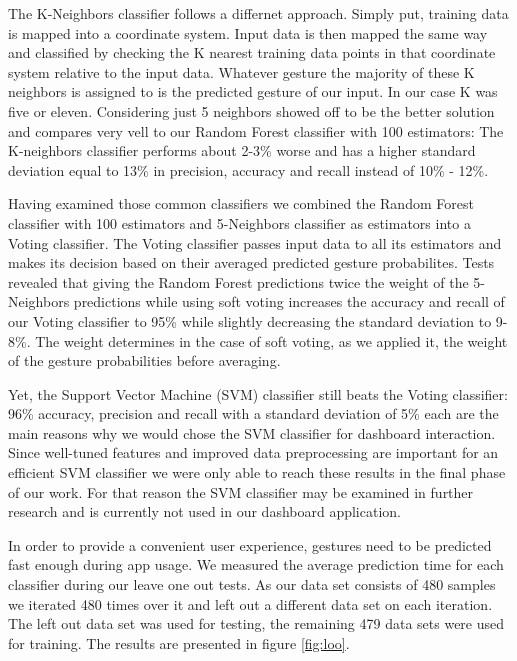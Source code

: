 The K-Neighbors classifier follows a differnet approach. Simply put, training data is mapped into a coordinate system. Input data is then mapped the same way and classified by checking the K nearest training data points in that coordinate system relative to the input data. Whatever gesture the majority of these K neighbors is assigned to is the predicted gesture of our input. In our case K was five or eleven. Considering just 5 neighbors showed off to be the better solution and compares very vell to our Random Forest classifier with 100 estimators: The K-neighbors classifier performs about 2-3\% worse and has a higher standard deviation equal to 13\% in precision, accuracy and recall instead of 10\% - 12\%.

Having examined those common classifiers we combined the Random Forest classifier with 100 estimators and 5-Neighbors classifier as estimators into a Voting classifier. The Voting classifier passes input data to all its estimators and makes its decision based on their averaged predicted gesture probabilites. Tests revealed that giving the Random Forest predictions twice the weight of the 5-Neighbors predictions while using soft voting increases the accuracy and recall of our Voting classifier to 95\% while slightly decreasing the standard deviation to 9-8\%. The weight determines in the case of soft voting, as we applied it, the weight of the gesture probabilities before averaging.

Yet, the Support Vector Machine (SVM) classifier still beats the Voting classifier: 96\% accuracy, precision and recall with a standard deviation of 5\% each are the main reasons why we would chose the SVM classifier for dashboard interaction. Since well-tuned features and improved data preprocessing are important for an efficient SVM classifier we were only able to reach these results in the final phase of our work. For that reason the SVM classifier may be examined in further research and is currently not used in our dashboard application.

In order to provide a convenient user experience, gestures need to be predicted fast enough during app usage. We measured the average prediction time for each classifier during our leave one out tests. As our data set consists of 480 samples we iterated 480 times over it and left out a different data set on each iteration. The left out data set was used for testing, the remaining 479 data sets were used for training. The results are presented in figure \ref{fig:loo}.

